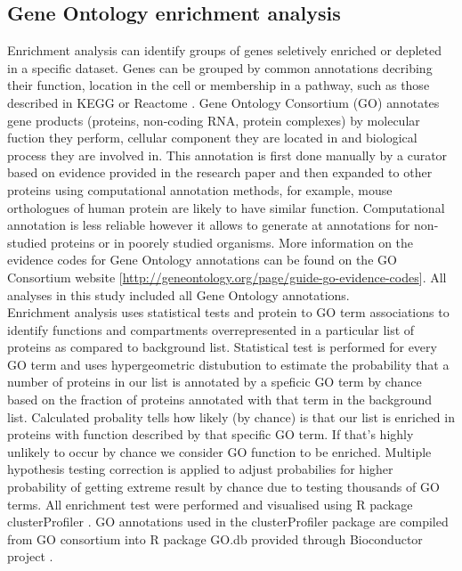 \documentclass[12pt,]{report}
\begin{document}
\subsection{Gene Ontology enrichment
analysis}\label{gene-ontology-enrichment-analysis}

Enrichment analysis can identify groups of genes seletively enriched or
depleted in a specific dataset. Genes can be grouped by common
annotations decribing their function, location in the cell or membership
in a pathway, such as those described in KEGG \citep{Kanehisa:2016aa} or
Reactome \citep{Fabregat:2016aa}. Gene Ontology Consortium (GO)
\citep{Gene-Ontology:2015aa} annotates gene products (proteins,
non-coding RNA, protein complexes) by molecular fuction they perform,
cellular component they are located in and biological process they are
involved in. This annotation is first done manually by a curator based
on evidence provided in the research paper and then expanded to other
proteins using computational annotation methods, for example, mouse
orthologues of human protein are likely to have similar function.
Computational annotation is less reliable however it allows to generate
at annotations for non-studied proteins or in poorely studied organisms.
More information on the evidence codes for Gene Ontology annotations can
be found on the GO Consortium website
{[}\url{http://geneontology.org/page/guide-go-evidence-codes}{]}. All
analyses in this study included all Gene Ontology annotations.\\
Enrichment analysis uses statistical tests and protein to GO term
associations to identify functions and compartments overrepresented in a
particular list of proteins as compared to background list. Statistical
test is performed for every GO term and uses hypergeometric distubution
to estimate the probability that a number of proteins in our list is
annotated by a speficic GO term by chance based on the fraction of
proteins annotated with that term in the background list. Calculated
probality tells how likely (by chance) is that our list is enriched in
proteins with function described by that specific GO term. If that's
highly unlikely to occur by chance we consider GO function to be
enriched. Multiple hypothesis testing correction is applied to adjust
probabilies for higher probability of getting extreme result by chance
due to testing thousands of GO terms. All enrichment test were performed
and visualised using R package clusterProfiler \citep{Yu:2012aa}. GO
annotations used in the clusterProfiler package are compiled from GO
consortium into R package GO.db \citep{GO.db} provided through
Bioconductor project \citep{Gentleman:2004aa}.
\end{document}
